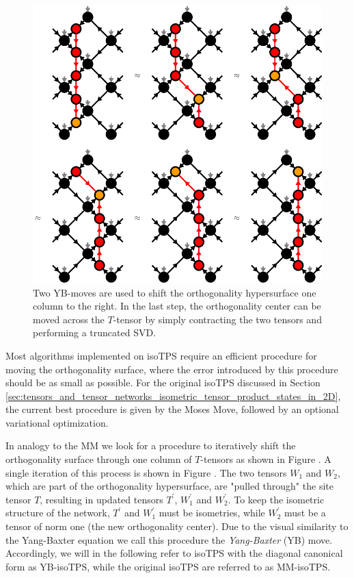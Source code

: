 \begin{figure}
	\centering
	\includegraphics[scale=1]{figures/tikz/YB_isoTPS/shifting_ortho_surface/shifting_ortho_surface.pdf}
	\caption{Two YB-moves are used to shift the orthogonality hypersurface one column to the right. In the last step, the orthogonality center can be moved across the $T$-tensor by simply contracting the two tensors and performing a truncated SVD.}
	\label{fig:YB_isoTPS_moving_ortho_surface}
\end{figure}
Most algorithms implemented on isoTPS require an efficient procedure for moving the orthogonality surface, where the error introduced by this procedure should be as small as possible. For the original isoTPS discussed in Section \ref{sec:tensors_and_tensor_networks_isometric_tensor_product_states_in_2D}, the current best procedure is given by the Moses Move, followed by an optional variational optimization. \par
In analogy to the MM we look for a procedure to iteratively shift the orthogonality surface through one column of $T$-tensors as shown in Figure . A single iteration of this process is shown in Figure . The two tensors $W_1$ and $W_2$, which are part of the orthogonality hypersurface, are "pulled through" the site tensor $T$, resulting in updated tensors $T^\prime$, $W_1^\prime$ and $W_2^\prime$. To keep the isometric structure of the network, $T^\prime$ and $W_1^\prime$ must be isometries, while $W_2^\prime$ must be a tensor of norm one (the new orthogonality center). Due to the visual similarity to the Yang-Baxter equation we call this procedure the \textit{Yang-Baxter} (YB) move. Accordingly, we will in the following refer to isoTPS with the diagonal canonical form as YB-isoTPS, while the original isoTPS are referred to as MM-isoTPS. \par
